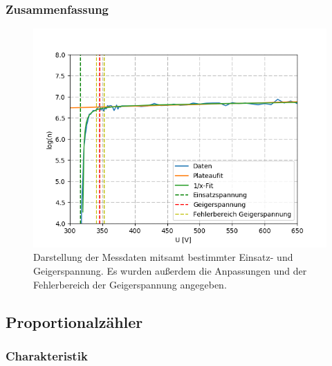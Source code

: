 \documentclass[12pt,a4paper]{article}
\begin{document}
\subsubsection{Zusammenfassung}

\begin{figure}
\centering
\includegraphics[scale=1]{Bilder/GMlog.PNG}
\caption{Darstellung der Messdaten mitsamt bestimmter Einsatz- und Geigerspannung. Es wurden außerdem die Anpassungen und der Fehlerbereich der Geigerspannung angegeben.}
\label{fig:GMCharakteristik}
\end{figure}


\subsection{Proportionalzähler}

\subsubsection{Charakteristik}
\end{document}
